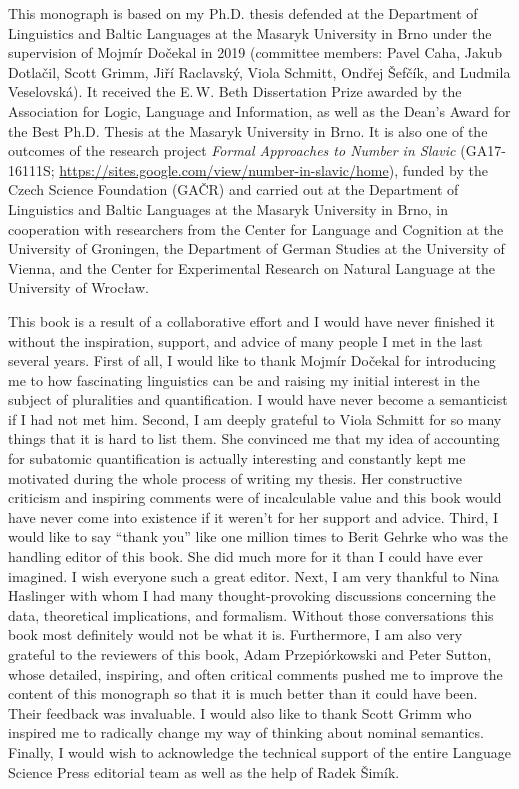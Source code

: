 \addchap{\lsAcknowledgementTitle} 

This monograph is based on my Ph.D. thesis defended at the Department of Linguistics and Baltic Languages at the Masaryk University in Brno under the supervision of Mojmír Dočekal in 2019 (committee members: Pavel Caha, Jakub Dotlačil, Scott Grimm, Jiří Raclavský, Viola Schmitt, Ondřej Šefčík, and Ludmila Veselovská). It received the E.\,W. Beth Dissertation Prize awarded by the Association for Logic, Language and Information, as well as the Dean’s Award for the Best Ph.D. Thesis at the Masaryk University in Brno. It is also one of the outcomes of the research project \textit{Formal Approaches to Number in Slavic} (GA17-16111S; \url{https://sites.google.com/view/number-in-slavic/home}), funded by the Czech Science Foundation (GAČR) and carried out at the Department of Linguistics and Baltic Languages at the Masaryk University in Brno, in cooperation with researchers from the Center for Language and Cognition at the University of Groningen, the Department of German Studies at the University of Vienna, and the Center for Experimental Research on Natural Language at the University of Wrocław.

This book is a result of a collaborative effort and I would have never finished it without the inspiration, support, and advice of many people I met in the last several years. First of all, I would like to thank Mojmír Dočekal for introducing me to how fascinating linguistics can be and raising my initial interest in the subject of pluralities and quantification. I would have never become a semanticist if I had not met him. Second, I am deeply grateful to Viola Schmitt for so many things that it is hard to list them. She convinced me that my idea of accounting for subatomic quantification is actually interesting and constantly kept me motivated during the whole process of writing my thesis. Her constructive criticism and inspiring comments were of incalculable value and this book would have never come into existence if it weren't for her support and advice. Third, I would like to say ``thank you'' like one million times to Berit Gehrke who was the handling editor of this book. She did much more for it than I could have ever imagined. I wish everyone such a great editor. Next, I am very thankful to Nina Haslinger with whom I had many thought-provoking discussions concerning the data, theoretical implications, and formalism. Without those conversations this book most definitely would not be what it is. Furthermore, I am also very grateful to the reviewers of this book, Adam Przepiórkowski and Peter Sutton, whose detailed, inspiring, and often critical comments pushed me to improve the content of this monograph so that it is much better than it could have been. Their feedback was invaluable. I would also like to thank Scott Grimm who inspired me to radically change my way of thinking about nominal semantics. Finally, I would wish to acknowledge the technical support of the entire Language Science Press editorial team as well as the help of Radek Šimík.

